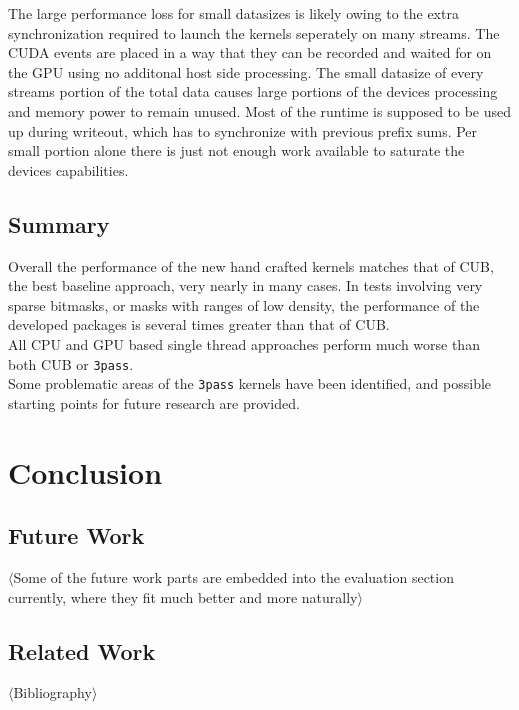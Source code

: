 \documentclass{tudscrreprt}
\newcommand{\markr}[1]{\textcolor{review}{$\langle$#1$\rangle$}}
\begin{document}
			The large performance loss for small datasizes is likely owing to the extra synchronization required to launch the kernels seperately on many streams. The CUDA events are placed in a way that they can be recorded and waited for on the GPU using no additonal host side processing. The small datasize of every streams portion of the total data causes large portions of the devices processing and memory power to remain unused. Most of the runtime is supposed to be used up during writeout, which has to synchronize with previous prefix sums. Per small portion alone there is just not enough work available to saturate the devices capabilities. \\
		
		\section{Summary}
			Overall the performance of the new hand crafted kernels matches that of CUB, the best baseline approach, very nearly in many cases. In tests involving very sparse bitmasks, or masks with ranges of low density, the performance of the developed packages is several times greater than that of CUB. \\
			All CPU and GPU based single thread approaches perform much worse than both CUB or \texttt{3pass}. \\
			
			Some problematic areas of the \texttt{3pass} kernels have been identified, and possible starting points for future research are provided. \\
		
	\chapter{Conclusion}
	
		\section{Future Work}
			\markr{Some of the future work parts are embedded into the evaluation section currently, where they fit much better and more naturally}\\
	
		\section{Related Work}
		
	\markr{Bibliography}\\
	
\end{document}

